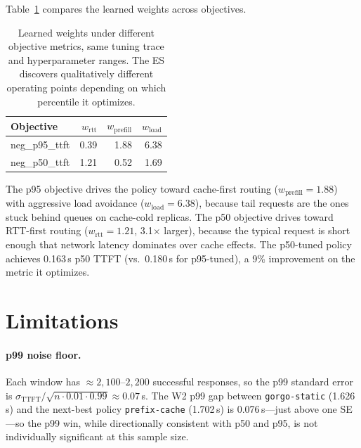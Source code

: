 \documentclass{article}
\begin{document}
Table~\ref{tab:weights_compare} compares the learned weights across objectives.

\begin{table}[t]
\centering
\small
\caption{Learned weights under different objective metrics, same tuning trace and
  hyperparameter ranges. The ES discovers qualitatively different operating
  points depending on which percentile it optimizes.}
\label{tab:weights_compare}
\begin{tabular}{lrrr}
\toprule
Objective & $w_{\mathrm{rtt}}$ & $w_{\mathrm{prefill}}$ & $w_{\mathrm{load}}$ \\
\midrule
neg\_p95\_ttft & 0.39 & 1.88 & 6.38 \\
neg\_p50\_ttft & 1.21 & 0.52 & 1.69 \\
\bottomrule
\end{tabular}
\end{table}

The p95 objective drives the policy toward cache-first routing
($w_{\mathrm{prefill}}{=}1.88$) with aggressive load avoidance
($w_{\mathrm{load}}{=}6.38$), because tail requests are the ones stuck behind
queues on cache-cold replicas. The p50 objective drives toward RTT-first
routing ($w_{\mathrm{rtt}}{=}1.21$, 3.1$\times$ larger), because the typical
request is short enough that network latency dominates over cache effects.
The p50-tuned policy achieves 0.163\,s p50 TTFT (vs.\ 0.180\,s for p95-tuned),
a 9\% improvement on the metric it optimizes.



\section{Limitations}
\label{sec:limitations}

\paragraph{p99 noise floor.}
Each window has $\approx\!2{,}100$--$2{,}200$ successful responses, so the p99
standard error is $\sigma_{\mathrm{TTFT}}/\sqrt{n\cdot 0.01\cdot 0.99}\approx
0.07$\,s. The W2 p99 gap between \texttt{gorgo-static} (1.626\,s) and
the next-best policy \texttt{prefix-cache} (1.702\,s) is 0.076\,s---just above
one SE---so the p99 win, while directionally consistent with p50 and p95, is not
individually significant at this sample size.
\end{document}
